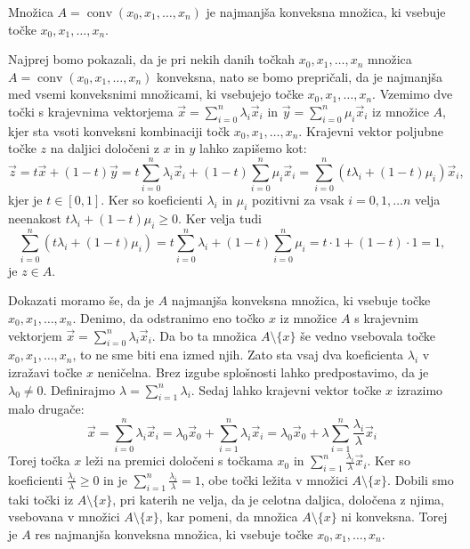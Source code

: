 \documentclass[mat1]{fmfdelo}
\DeclareMathOperator{\conv}{conv}
\newcommand{\0}{\underline{0}}
\begin{document}
\begin{trditev}\label{trd:min-conv}
Množica $A = \conv(x_0, x_1, \dots, x_n)$ je najmanjša konveksna množica, ki vsebuje točke $x_0, x_1, \dots, x_n$.
\end{trditev}
\begin{dokaz}
Najprej bomo pokazali, da je pri nekih danih točkah $x_0, x_1, \dots, x_n$ množica $A = \conv(x_0, x_1, \dots, x_n)$ konveksna, nato se bomo prepričali, da je najmanjša med vsemi konveksnimi množicami, ki vsebujejo točke $x_0, x_1, \dots, x_n$. Vzemimo dve točki s krajevnima vektorjema $\vec{x} = \sum\limits_{i=0}^n \lambda_i \vec{x}_i$ in $\vec{y} = \sum\limits_{i=0}^n \mu_i \vec{x}_i$ iz množice $A$, kjer sta vsoti konveksni kombinaciji točk $x_0, x_1, \dots, x_n$.
Krajevni vektor poljubne točke $z$ na daljici določeni z $x$ in $y$ lahko zapišemo kot:
$$\vec{z} = t \vec{x} + (1-t) \vec{y} = t \sum\limits_{i=0}^n \lambda_i \vec{x}_i + (1 - t) \sum\limits_{i=0}^n \mu_i \vec{x}_i = \sum\limits_{i=0}^n (t \lambda_i + (1 - t) \mu_i) \vec{x}_i,$$
kjer je $t \in [0, 1]$. Ker so koeficienti $\lambda_i$ in $\mu_i$ pozitivni za vsak $i = 0, 1, \dots n$ velja neenakost $t \lambda_i + (1 - t) \mu_i \geq 0$. Ker velja tudi
$$\sum\limits_{i=0}^n (t \lambda_i + (1 - t) \mu_i) = t \sum\limits_{i=0}^n \lambda_i + (1 - t) \sum\limits_{i=0}^n \mu_i = t \cdot 1 + (1 - t) \cdot 1 = 1,$$
je $z \in A$.

Dokazati moramo še, da je $A$ najmanjša konveksna množica, ki vsebuje točke $x_0, x_1, \dots, x_n$. Denimo, da odstranimo eno točko $x$ iz množice $A$ s krajevnim vektorjem $\vec{x} = \sum\limits_{i=0}^n \lambda_i \vec{x}_i$. Da bo ta množica $A \setminus \{ x \}$ še vedno vsebovala točke $x_0, x_1, \dots, x_n$, to ne sme biti ena izmed njih. Zato sta vsaj dva koeficienta $\lambda_i$ v izražavi točke $x$ neničelna. Brez izgube splošnosti lahko predpostavimo, da je $\lambda_0 \neq 0$. Definirajmo $\lambda =  \sum\limits_{i=1}^n \lambda_i$. Sedaj lahko krajevni vektor točke $x$ izrazimo malo drugače:
$$\vec{x} = \sum\limits_{i=0}^n \lambda_i \vec{x}_i = \lambda_0 \vec{x}_0 + \sum\limits_{i=1}^n \lambda_i \vec{x}_i = \lambda_0 \vec{x}_0 + \lambda \sum\limits_{i=1}^n \frac{\lambda_i}{\lambda} \vec{x}_i$$
Torej točka $x$ leži na premici določeni s točkama $x_0$ in $\sum\limits_{i=1}^n \frac{\lambda_i}{\lambda} \vec{x}_i$. Ker so koeficienti $\frac{\lambda_i}{\lambda} \geq 0$ in je $\sum\limits_{i=1}^n \frac{\lambda_i}{\lambda} = 1$, obe točki ležita v množici $A \setminus \{ x \}$. Dobili smo taki točki iz $A \setminus \{ x \}$, pri katerih ne velja, da je celotna daljica, določena z njima, vsebovana v množici $A \setminus \{ x \}$, kar pomeni, da množica $A \setminus \{ x \}$ ni konveksna. Torej je $A$ res najmanjša konveksna množica, ki vsebuje točke $x_0, x_1, \dots, x_n$.
\end{dokaz}
\end{document}

